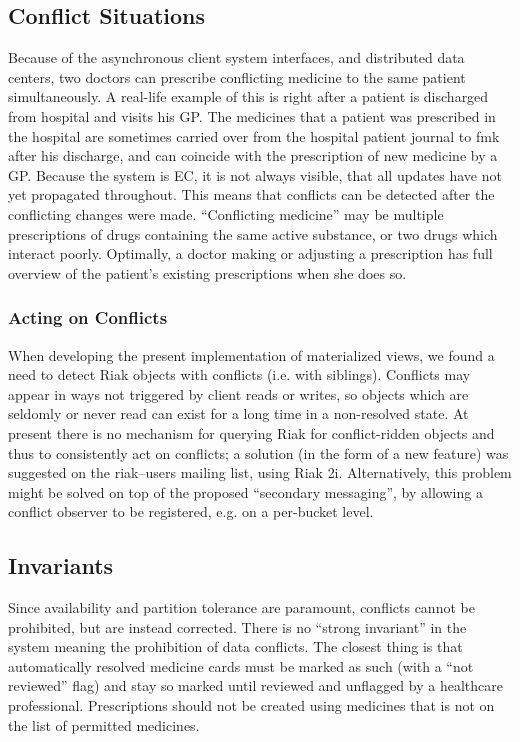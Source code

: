 \documentclass[11pt,a4paper]{report}
\begin{document}
\subsection{Conflict Situations}
Because of the asynchronous client system interfaces, and distributed data centers, two doctors can prescribe conflicting medicine to the same patient simultaneously. A real-life example of this is right after a patient is discharged from hospital and visits his GP. The medicines that a patient was prescribed in the hospital are sometimes carried over from the hospital patient journal to \gls{fmk} after his discharge, and can coincide with the prescription of new medicine by a GP.
Because the system is EC, it is not always visible, that all updates have not yet propagated throughout. This means that conflicts can be detected after the conflicting changes were made.
``Conflicting medicine'' may be multiple prescriptions of drugs containing the same active substance, or two drugs which interact poorly. Optimally, a doctor making or adjusting a prescription has full overview of the patient's existing prescriptions when she does so.

\subsubsection{Acting on Conflicts}
When developing the present implementation of materialized views, we found a need to detect Riak objects with conflicts (i.e. with siblings). Conflicts may appear in ways not triggered by client reads or writes, so objects which are seldomly or never read can exist for a long time in a non-resolved state. At present there is no mechanism for querying Riak for conflict-ridden objects and thus to consistently act on conflicts; a solution (in the form of a new feature) was suggested on the riak--users mailing list, using Riak \gls{2i}.
Alternatively, this problem might be solved on top of the proposed ``secondary messaging'', by allowing a conflict observer to be registered, e.g. on a per-bucket level.

\subsection{Invariants}
Since availability and partition tolerance are paramount, conflicts cannot be prohibited, but are instead corrected. There is no ``strong invariant'' in the system meaning the prohibition of data conflicts. The closest thing is that automatically resolved medicine cards must be marked as such (with a ``not reviewed'' flag) and stay so marked until reviewed and unflagged by a healthcare professional.
Prescriptions should not be created using medicines that is not on  the list of permitted medicines.
\end{document}
